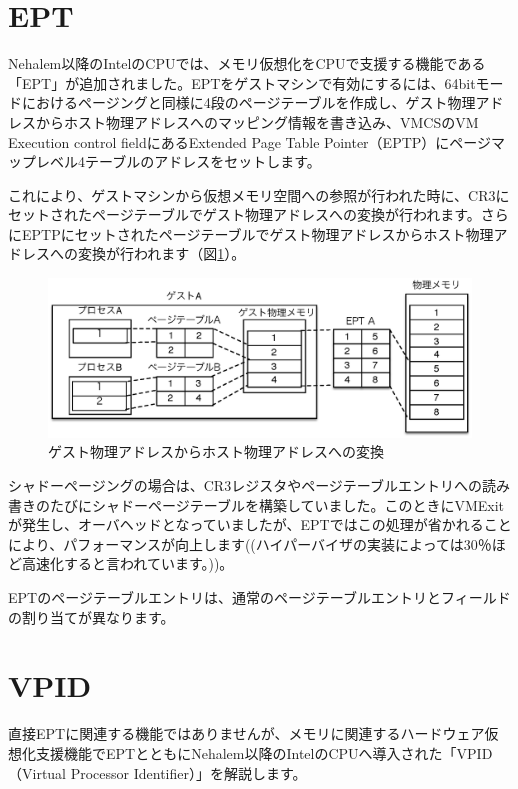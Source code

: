 \section{EPT}
Nehalem以降のIntelのCPUでは、メモリ仮想化をCPUで支援する機能である「EPT」が追加されました。EPTをゲストマシンで有効にするには、64bitモードにおけるページングと同様に4段のページテーブルを作成し、ゲスト物理アドレスからホスト物理アドレスへのマッピング情報を書き込み、VMCSのVM Execution control fieldにあるExtended Page Table Pointer（EPTP）にページマップレベル4テーブルのアドレスをセットします。

これにより、ゲストマシンから仮想メモリ空間への参照が行われた時に、CR3にセットされたページテーブルでゲスト物理アドレスへの変換が行われます。さらにEPTPにセットされたページテーブルでゲスト物理アドレスからホスト物理アドレスへの変換が行われます（図\ref{fig7}）。

\begin{figure}\centering
\includegraphics[width=1.0\textwidth]{figures/part2_fig7.eps}
\caption{ゲスト物理アドレスからホスト物理アドレスへの変換}
\label{fig7}
\end{figure}

シャドーページングの場合は、CR3レジスタやページテーブルエントリへの読み書きのたびにシャドーページテーブルを構築していました。このときにVMExitが発生し、オーバヘッドとなっていましたが、EPTではこの処理が省かれることにより、パフォーマンスが向上します((ハイパーバイザの実装によっては30％ほど高速化すると言われています。))。

EPTのページテーブルエントリは、通常のページテーブルエントリとフィールドの割り当てが異なります。

\section{VPID}
直接EPTに関連する機能ではありませんが、メモリに関連するハードウェア仮想化支援機能でEPTとともにNehalem以降のIntelのCPUへ導入された「VPID（Virtual Processor Identifier）」を解説します。

